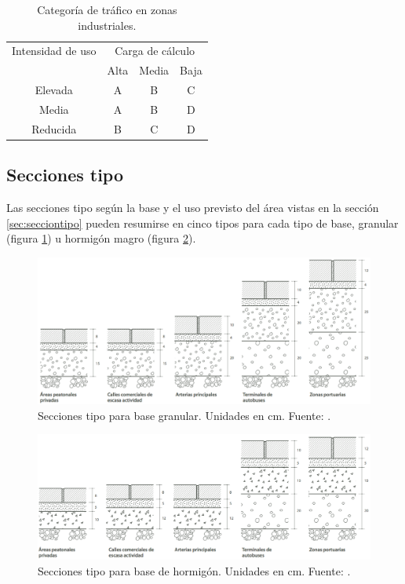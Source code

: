 \begin{table}[!htb]
\centering
\begin{tabular}{cccc}
\toprule
Intensidad de uso & \multicolumn{3}{c}{Carga de cálculo}\\
\cmidrule{2-4}
& Alta & Media & Baja\\
\midrule
Elevada & A & B & C\\
Media & A & B & D\\
Reducida & B & C & D\\
\bottomrule
\end{tabular}
\caption{Categoría de tráfico en zonas industriales.}
\label{categoriadetraficoenzonasindustriales}
\end{table}

\subsection{Secciones tipo}

Las secciones tipo según la base y el uso previsto del área vistas en la sección \ref{sec:secciontipo} pueden resumirse en cinco tipos para cada tipo de base, granular (figura \ref{fig:seccionestipogranular}) u hormigón magro (figura \ref{fig:seccionestipohormigon}).

\begin{figure}[!htb]
\centering
\includegraphics[width=15cm]{seccionestipo_1.png}
\caption[Secciones tipo para base granular.]{Secciones tipo para base granular. Unidades en cm. Fuente: \cite{fenollar}.}
\label{fig:seccionestipogranular}
\end{figure}

\begin{figure}[!htb]
\centering
\includegraphics[width=15cm]{seccionestipo_2.png}
\caption[Secciones tipo para base de hormigón.]{Secciones tipo para base de hormigón. Unidades en cm. Fuente: \cite{fenollar}.}
\label{fig:seccionestipohormigon}
\end{figure}


